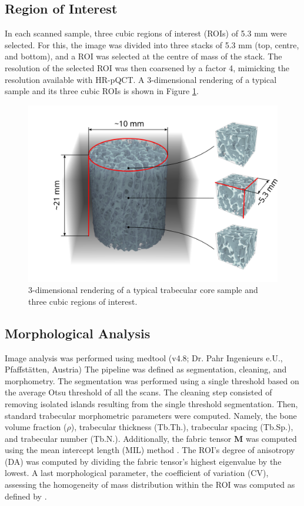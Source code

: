 \documentclass[a4paper,fleqn]{DC_ArtStyle}
\begin{document}
	\subsection{Region of Interest}
	In each scanned sample, three cubic regions of interest (ROIs) of 5.3 mm were selected.
	For this, the image was divided into three stacks of 5.3 mm (top, centre, and bottom), and a ROI was selected at the centre of mass of the stack.
	The resolution of the selected ROI was then coarsened by a factor 4, mimicking the resolution available with HR-pQCT.
	A 3-dimensional rendering of a typical sample and its three cubic ROIs is shown in Figure \ref{FigSample}.
   
	\begin{figure}
		\includegraphics[width=\linewidth]{Sample}
		\caption{3-dimensional rendering of a typical trabecular core sample and three cubic regions of interest.}
		\label{FigSample}
	\end{figure}

	\subsection{Morphological Analysis}
	Image analysis was performed using medtool (v4.8; Dr. Pahr Ingenieurs e.U., Pfaffstätten, Austria)
	The pipeline was defined as segmentation, cleaning, and morphometry.
	The segmentation was performed using a single threshold based on the average Otsu threshold \cite{Otsu1979} of all the scans.
	The cleaning step consisted of removing isolated islands resulting from the single threshold segmentation.
	Then, standard trabecular morphometric parameters were computed.
	Namely, the bone volume fraction ($\rho$), trabecular thickness (Tb.Th.), trabecular spacing (Tb.Sp.), and trabecular number (Tb.N.).
	Additionally, the fabric tensor $\mathbf{M}$ was computed using the mean intercept length (MIL) method \cite{Moreno2014}.
	The ROI's degree of anisotropy (DA) was computed by dividing the fabric tensor's highest eigenvalue by the lowest.
	A last morphological parameter, the coefficient of variation (CV), assessing the homogeneity of mass distribution within the ROI was computed as defined by \citeauthor{Panyasantisuk2015} \cite{Panyasantisuk2015}.
\end{document}
